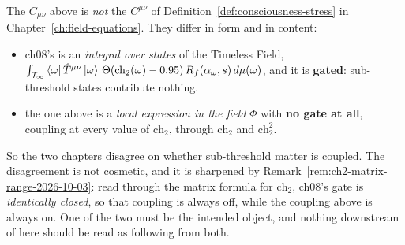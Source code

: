 \begin{remark}
\label{rem:two-C-tensors-2026-10-03}
The $C_{\mu\nu}$ above is \emph{not} the $C^{\mu\nu}$ of
Definition~\ref{def:consciousness-stress} in Chapter~\ref{ch:field-equations}.
They differ in form and in content:

\begin{itemize}
\item ch08's is an \emph{integral over states} of the Timeless Field,
  $\int_{\mathcal{T}_\infty} \bra{\omega}\hat{T}^{\mu\nu}\ket{\omega}\,
  \Theta(\text{ch}_2(\omega) - 0.95)\, R_f(\alpha_\omega, s)\, d\mu(\omega)$,
  and it is \textbf{gated}: sub-threshold states contribute nothing.
\item the one above is a \emph{local expression in the field} $\Phi$ with
  \textbf{no gate at all}, coupling at every value of $\text{ch}_2$, through
  $\text{ch}_2$ and $\text{ch}_2^2$.
\end{itemize}

So the two chapters disagree on whether sub-threshold matter is coupled. The
disagreement is not cosmetic, and it is sharpened by
Remark~\ref{rem:ch2-matrix-range-2026-10-03}: read through the matrix formula for
$\text{ch}_2$, ch08's gate is \emph{identically closed}, so that coupling is
always off, while the coupling above is always on. One of the two must be the
intended object, and nothing downstream of here should be read as following
from both.


\end{remark}
